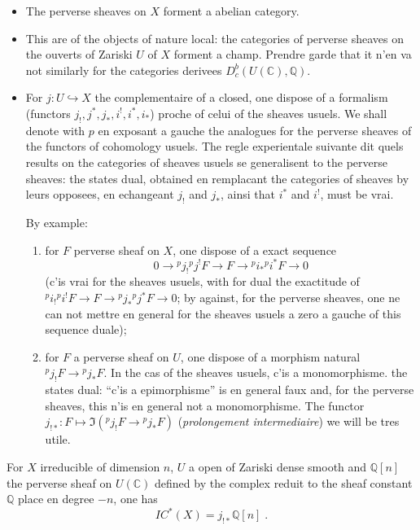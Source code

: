 \documentclass[12pt,a4paper]{article}
\theoremstyle{plain}
\theoremstyle{definition}
\theoremstyle{remark}
\newcommand{\IC}{\mathit{IC}}
\newcommand{\CC}{\mathbb{C}}
\newcommand{\QQ}{\mathbb{Q}}
\begin{document}
\begin{itemize}
\item The perverse sheaves on $X$ forment a abelian category.
\item This are of the objects of nature local: the categories of perverse sheaves on the ouverts of Zariski $U$ of $X$ forment a champ. Prendre garde that it n'en va not similarly for the categories derivees $D^{b}_{c}(U(\CC), \QQ)$.
\item For $j : U \hookrightarrow X$ the complementaire of a closed, one dispose of a formalism (functors $j_{!}, j^{*}, j_{*}, i^{!}, i^{*}, i_{*}$) proche of celui of the sheaves usuels. We shall denote with $p$ en exposant a gauche the analogues for the perverse sheaves of the functors of cohomology usuels. The regle experientale suivante dit quels results on the categories of sheaves usuels se generalisent to the perverse sheaves: the states dual, obtained en remplacant the categories of sheaves by leurs opposees, en echangeant $j_{!}$ and $j_{*}$, ainsi that $i^{*}$ and $i^{!}$, must be vrai.

By example:
\begin{enumerate}[label=\alph*)]
\item for $F$ perverse sheaf on $X$, one dispose of a exact sequence
\[
0 \to {}^{p}j_{!}{}^{p}j^{!}F \to F \to {}^{p}i_{*}{}^{p}i^{*}F \to 0
\]
(c'is vrai for the sheaves usuels, with for dual the exactitude of ${}^{p}i_{!}{}^{p}i^{!}F \to F \to {}^{p}j_{*}{}^{p}j^{*}F \to 0$; by against, for the perverse sheaves, one ne can not mettre en general for the sheaves usuels a zero a gauche of this sequence duale);
\item for $F$ a perverse sheaf on $U$, one dispose of a morphism natural ${}^{p}j_{!}F \to {}^{p}j_{*}F$. In the cas of the sheaves usuels, c'is a monomorphisme. the states dual: ``c'is a epimorphisme'' is en general faux and, for the perverse sheaves, this n'is en general not a monomorphisme. The functor $j_{!*} : F \mapsto \Im({}^{p}j_{!}F \to {}^{p}j_{*}F)$ (\emph{prolongement intermediaire}) we will be tres utile.
\end{enumerate}
\end{itemize}

\medskip

For $X$ irreducible of dimension $n$, $U$ a open of Zariski dense smooth and $\QQ[n]$ the perverse sheaf on $U(\CC)$ defined by the complex reduit to the sheaf constant $\QQ$ place en degree $-n$, one has
\[
\IC^{*}(X) = j_{!*}\QQ[n]\;.
\]
\end{document}
